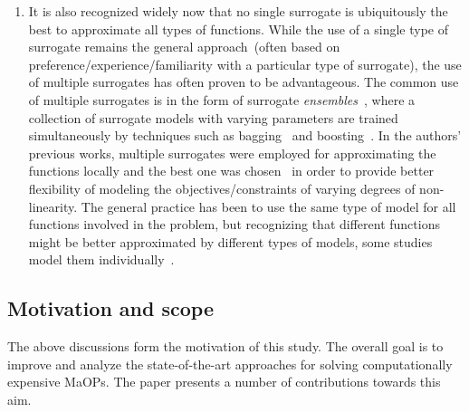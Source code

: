 \documentclass[twocolumn,10pt]{asme2ej}
\begin{document}
\begin{enumerate}
\item It is also recognized widely now that no single surrogate is ubiquitously the best to approximate all types of functions. While the use of a single type of surrogate remains the general approach~(often based on preference/experience/familiarity with a particular type of surrogate),  the use of multiple surrogates has often proven to be advantageous. The common use of multiple surrogates is in the form of surrogate \textit{ensembles}~\cite{goel_ensemble_2007,zerpa_optimization_2005, hamza2012co}, where a collection of surrogate models with varying parameters are trained simultaneously by techniques such as bagging~\cite{breiman_bagging_1996} and boosting~\cite{abney_boosting_1999}. In the authors' previous works, multiple surrogates were employed for approximating the functions locally and the best one was chosen~\cite{KHTjmd2016,bhattacharjee2016multiple,KHTisaacs2009multi} in order to provide better flexibility of modeling the objectives/constraints of varying degrees of non-linearity. The general practice has been to use the same type of model for all functions involved in the problem, but recognizing that different functions might be better approximated by different types of models, some studies model them individually~\cite{KHTjmd2016,bhattacharjee2016multiple}. 

\end{enumerate}

\subsection{Motivation and scope}

The above discussions form the motivation of this study. The overall goal is to improve and analyze the state-of-the-art approaches for solving computationally expensive MaOPs. The paper presents a number of contributions towards this aim. 
\end{document}
